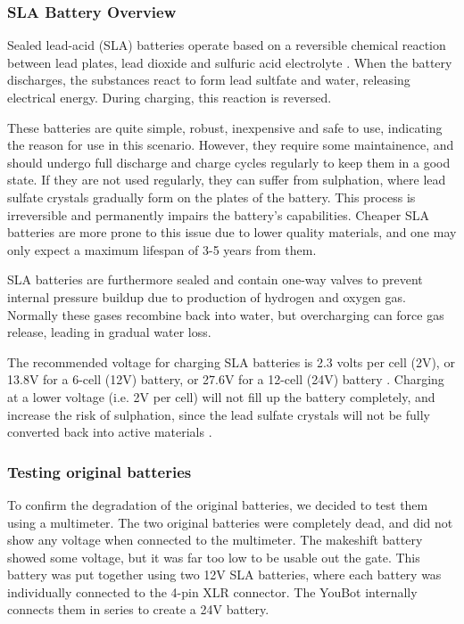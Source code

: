 \documentclass[a4paper, 12pt]{article}
\begin{document}
    \subsubsection{SLA Battery Overview}

    Sealed lead-acid (SLA) batteries operate based on a reversible chemical reaction between lead plates, lead dioxide and sulfuric acid electrolyte \cite{batterymasters_sla}. When the battery discharges, the substances react to form lead sultfate and water, releasing electrical energy. During charging, this reaction is reversed.

    These batteries are quite simple, robust, inexpensive and safe to use, indicating the reason for use in this scenario. However, they require some maintainence, and should undergo full discharge and charge cycles regularly to keep them in a good state. If they are not used regularly, they can suffer from sulphation, where lead sulfate crystals gradually form on the plates of the battery. This process is irreversible and permanently impairs the battery's capabilities. Cheaper SLA batteries are more prone to this issue due to lower quality materials, and one may only expect a maximum lifespan of 3-5 years from them. 

    SLA batteries are furthermore sealed and contain one-way valves to prevent internal pressure buildup due to production of hydrogen and oxygen gas. Normally these gases recombine back into water, but overcharging can force gas release, leading in gradual water loss. 

    The recommended voltage for charging SLA batteries is 2.3 volts per cell (2V), or 13.8V for a 6-cell (12V) battery, or 27.6V for a 12-cell (24V) battery \cite{powerstream_sla}. Charging at a lower voltage (i.e. 2V per cell) will not fill up the battery completely, and increase the risk of sulphation, since the lead sulfate crystals will not be fully converted back into active materials \cite{powersonic_charging}. 

    \subsubsection{Testing original batteries}

    To confirm the degradation of the original batteries, we decided to test them using a multimeter. The two original batteries were completely dead, and did not show any voltage when connected to the multimeter. The makeshift battery showed some voltage, but it was far too low to be usable out the gate. This battery was put together using two 12V SLA batteries, where each battery was individually connected to the 4-pin XLR connector. The YouBot internally connects them in series to create a 24V battery.   
    
\end{document}
